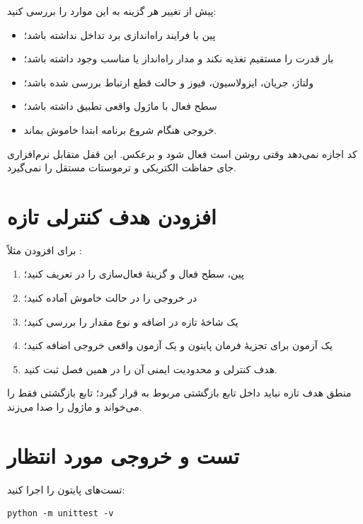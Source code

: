 پیش از تغییر هر گزینه به
این موارد را بررسی کنید:

\begin{itemize}
  \item پین با فرایند راه‌اندازی برد تداخل نداشته باشد؛
  \item
  بار قدرت را مستقیم تغذیه نکند و مدار راه‌انداز یا
  مناسب وجود داشته باشد؛
  \item ولتاژ، جریان، ایزولاسیون، فیوز و حالت قطع ارتباط بررسی شده باشد؛
  \item سطح فعال
  با ماژول واقعی تطبیق داشته باشد؛
  \item خروجی هنگام شروع برنامه ابتدا خاموش بماند.
\end{itemize}

کد اجازه نمی‌دهد
وقتی
روشن است فعال شود و برعکس. این قفل متقابل نرم‌افزاری جای حفاظت الکتریکی و ترموستات مستقل را نمی‌گیرد.

\section{افزودن هدف کنترلی تازه}
برای افزودن مثلاً
:

\begin{enumerate}
  \item پین، سطح فعال و گزینهٔ فعال‌سازی را در
  تعریف کنید؛
  \item در
  خروجی را در حالت خاموش آماده کنید؛
  \item یک شاخهٔ تازه در
  اضافه و نوع مقدار را بررسی کنید؛
  \item یک آزمون برای تجزیهٔ فرمان پایتون و یک آزمون واقعی خروجی اضافه کنید؛
  \item هدف کنترلی و محدودیت ایمنی آن را در همین فصل ثبت کنید.
\end{enumerate}

منطق هدف تازه نباید داخل تابع بازگشتی مربوط به
قرار گیرد؛ تابع بازگشتی فقط
را می‌خواند و ماژول
را صدا می‌زند.

\section{تست و خروجی مورد انتظار}
تست‌های پایتون را اجرا کنید:

\begin{LTR}
\begin{lstlisting}
python -m unittest -v
\end{lstlisting}
\end{LTR}


